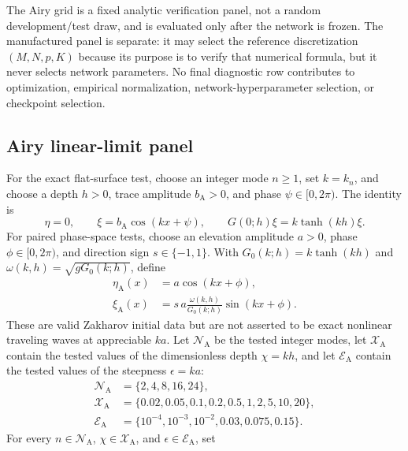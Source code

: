 \documentclass[11pt]{article}
\begin{document}
The Airy grid is a fixed analytic verification panel, not a random
development/test draw, and is evaluated only after the network is frozen.
The manufactured panel is separate: it may select the reference
discretization $(M,N,p,K)$ because its purpose is to verify that numerical
formula, but it never selects network parameters.  No final diagnostic row
contributes to optimization, empirical normalization, network-hyperparameter
selection, or checkpoint selection.

\subsection{Airy linear-limit panel}

For the exact flat-surface test, choose an integer mode $n\geq1$, set
$k=k_n$, and choose a depth $h>0$, trace amplitude $b_{\mathrm A}>0$, and phase
$\psi\in[0,2\pi)$.  The identity is
\begin{equation}
  \eta=0,\qquad
  \xi=b_{\mathrm A}\cos(kx+\psi),\qquad
  G(0;h)\xi=k\tanh(kh)\xi.
  \label{eq:flat-dno-test}
\end{equation}
For paired phase-space tests, choose an elevation amplitude $a>0$, phase
$\phi\in[0,2\pi)$, and direction sign $s\in\{-1,1\}$.  With
$G_0(k;h)=k\tanh(kh)$ and
$\omega(k,h)=\sqrt{gG_0(k;h)}$, define
\begin{align}
  \eta_{\mathrm A}(x)&=a\cos(kx+\phi),\\
  \xi_{\mathrm A}(x)&=s\,a
  \frac{\omega(k,h)}{G_0(k;h)}\sin(kx+\phi).
  \label{eq:airy-constructor}
\end{align}
These are valid Zakharov initial data but are not asserted to be exact
nonlinear traveling waves at appreciable $ka$.  Let $\mathcal N_{\mathrm A}$
be the tested integer modes, let $\mathcal X_{\mathrm A}$ contain the tested
values of the dimensionless depth $\chi=kh$, and let
$\mathcal E_{\mathrm A}$ contain the tested values of the steepness
$\epsilon=ka$:
\begin{equation}
  \begin{aligned}
  \mathcal N_{\mathrm A}&=\{2,4,8,16,24\},\\
  \mathcal X_{\mathrm A}&=\{0.02,0.05,0.1,0.2,0.5,1,2,5,10,20\},\\
  \mathcal E_{\mathrm A}&=\{10^{-4},10^{-3},10^{-2},0.03,0.075,0.15\}.
  \end{aligned}
  \label{eq:airy-diagnostic-grid}
\end{equation}
For every $n\in\mathcal N_{\mathrm A}$, $\chi\in\mathcal X_{\mathrm A}$,
and $\epsilon\in\mathcal E_{\mathrm A}$, set
\end{document}

